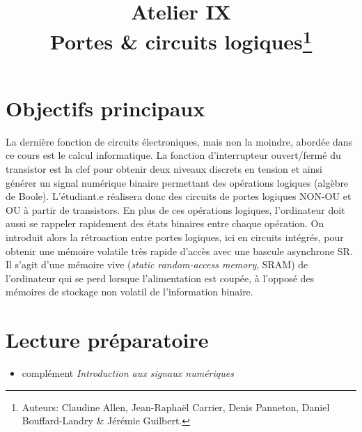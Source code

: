 \documentclass[canadien,12pt,oneside,letterpaper]{article}
\title{\textbf{Atelier IX}\\Portes \& circuits logiques\thanks{Auteurs: Claudine Allen, Jean-Raphaël Carrier, Denis Panneton, Daniel Bouffard-Landry \& Jérémie Guilbert.}}
\date{}
\begin{document}
\maketitle \vspace{-17ex}

\section{Objectifs principaux}\label{sec:objectifs}
\vspace{-2ex}
La dernière fonction de circuits électroniques, mais non la moindre, abordée dans ce cours est le calcul informatique. La fonction d’interrupteur ouvert/fermé du transistor est la clef pour obtenir deux niveaux discrets en tension et ainsi générer un signal numérique binaire permettant des opérations logiques (algèbre de Boole). L’étudiant.e réalisera donc des circuits de portes logiques NON-OU et OU à partir de transistors. En plus de ces opérations logiques, l’ordinateur doit aussi se rappeler rapidement des états binaires entre chaque opération. On introduit alors la rétroaction entre portes logiques, ici en circuits intégrés, pour obtenir une mémoire volatile très rapide d’accès avec une bascule asynchrone SR. Il s’agit d’une mémoire vive (\textit{static random-access memory}, SRAM) de l’ordinateur qui se perd lorsque l’alimentation est coupée, à l’opposé des mémoires de stockage non volatil de l’information binaire. 




\vspace{-2ex}
\section{Lecture préparatoire}
\vspace{-2ex}
\begin{itemize}
\item complément \textit{Introduction aux signaux numériques}
\end{itemize}
\end{document}
